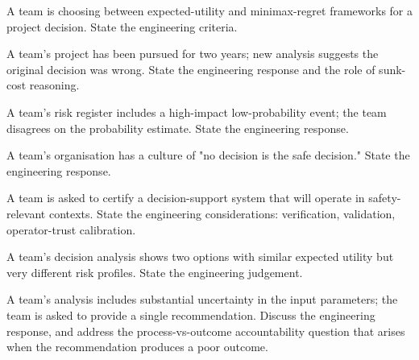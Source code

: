 \begin{exercise}
A team is choosing between expected-utility and minimax-regret frameworks for a project decision. State the engineering criteria.
\end{exercise}

\begin{exercise}
A team's project has been pursued for two years; new analysis suggests the original decision was wrong. State the engineering response and the role of sunk-cost reasoning.
\end{exercise}

\begin{exercise}
A team's risk register includes a high-impact low-probability event; the team disagrees on the probability estimate. State the engineering response.
\end{exercise}

\begin{exercise}
A team's organisation has a culture of "no decision is the safe decision." State the engineering response.
\end{exercise}

\begin{exercise}
A team is asked to certify a decision-support system that will operate in safety-relevant contexts. State the engineering considerations: verification, validation, operator-trust calibration.
\end{exercise}

\begin{exercise}
A team's decision analysis shows two options with similar expected utility but very different risk profiles. State the engineering judgement.
\end{exercise}

\begin{exercise}
A team's analysis includes substantial uncertainty in the input parameters; the team is asked to provide a single recommendation. Discuss the engineering response, and address the process-vs-outcome accountability question that arises when the recommendation produces a poor outcome.
\end{exercise}
